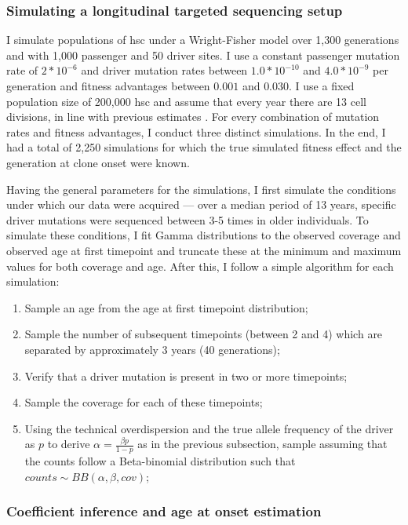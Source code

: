 \subsubsection{Simulating a longitudinal targeted sequencing setup}

I simulate populations of \ac{hsc} under a Wright-Fisher model \cite{Beerenwinkel_undated-up} over 1,300 generations and with 1,000 passenger and 50 driver sites. I use a constant passenger mutation rate of $2*10^{-6}$ and driver mutation rates between $1.0*10^{-10}$ and $4.0*10^{-9}$ per generation and fitness advantages between $0.001$ and $0.030$. I use a fixed population size of 200,000 \ac{hsc} and assume that every year there are 13 cell divisions, in line with previous estimates \cite{Lee-Six2018-lp,Watson2020-pz}. For every combination of mutation rates and fitness advantages, I conduct three distinct simulations. In the end, I had a total of 2,250 simulations for which the true simulated fitness effect and the generation at clone onset were known.

Having the general parameters for the simulations, I first simulate the conditions under which our data were acquired --- over a median period of 13 years, specific driver mutations were sequenced between 3-5 times in older individuals. To simulate these conditions, I fit Gamma distributions to the observed coverage and observed age at first timepoint and truncate these at the minimum and maximum values for both coverage and age. After this, I follow a simple algorithm for each simulation:

\begin{enumerate}
    \item Sample an age from the age at first timepoint distribution;
    \item Sample the number of subsequent timepoints (between 2 and 4) which are separated by approximately 3 years (40 generations);
    \item Verify that a driver mutation is present in two or more timepoints;
    \item Sample the coverage for each of these timepoints;
    \item Using the technical overdispersion and the true allele frequency of the driver as $p$ to derive $\alpha = \frac{\beta p}{1-p}$ as in the previous subsection, sample assuming that the counts follow a Beta-binomial distribution such that $counts \sim BB(\alpha,\beta,cov)$;
\end{enumerate}

\subsubsection{Coefficient inference and age at onset estimation}

